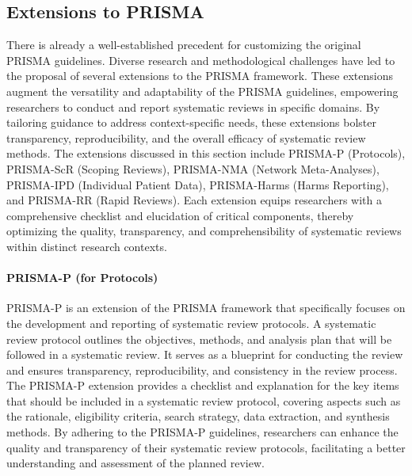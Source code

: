 \documentclass{article}
\begin{document}
\subsection{Extensions to PRISMA}


There is already a well-established precedent for customizing the original PRISMA guidelines. Diverse research and methodological challenges have led to the proposal of several extensions to the PRISMA framework. These extensions augment the versatility and adaptability of the PRISMA guidelines, empowering researchers to conduct and report systematic reviews in specific domains. By tailoring guidance to address context-specific needs, these extensions bolster transparency, reproducibility, and the overall efficacy of systematic review methods. The extensions discussed in this section include PRISMA-P (Protocols), PRISMA-ScR (Scoping Reviews), PRISMA-NMA (Network Meta-Analyses), PRISMA-IPD (Individual Patient Data), PRISMA-Harms (Harms Reporting), and PRISMA-RR (Rapid Reviews). Each extension equips researchers with a comprehensive checklist and elucidation of critical components, thereby optimizing the quality, transparency, and comprehensibility of systematic reviews within distinct research contexts.

\paragraph*{PRISMA-P (for Protocols)}
PRISMA-P \cite{moher2015preferred} is an extension of the PRISMA framework that specifically focuses on the development and reporting of systematic review protocols. A systematic review protocol outlines the objectives, methods, and analysis plan that will be followed in a systematic review. It serves as a blueprint for conducting the review and ensures transparency, reproducibility, and consistency in the review process. The PRISMA-P extension provides a checklist and explanation for the key items that should be included in a systematic review protocol, covering aspects such as the rationale, eligibility criteria, search strategy, data extraction, and synthesis methods. By adhering to the PRISMA-P guidelines, researchers can enhance the quality and transparency of their systematic review protocols, facilitating a better understanding and assessment of the planned review.
\end{document}

